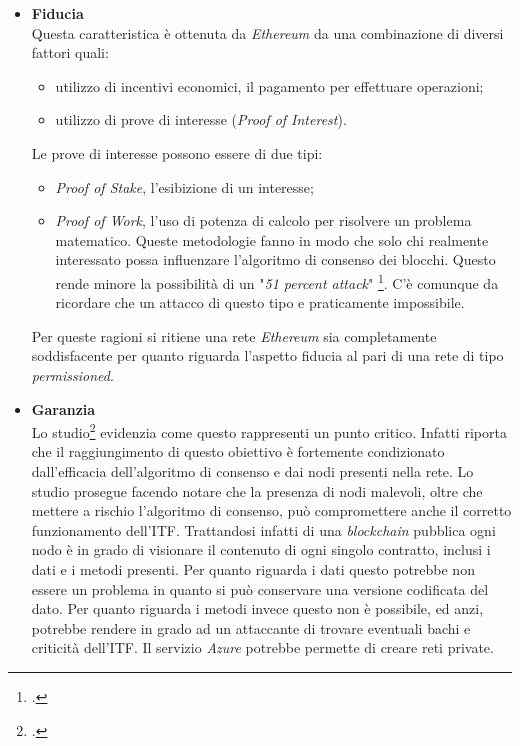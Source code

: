 \begin{itemize}
    \item \textbf{Fiducia} \\
    Questa caratteristica è ottenuta da \emph{Ethereum} da una combinazione di diversi fattori quali:
    \begin{itemize}
        \item utilizzo di incentivi economici, il pagamento per effettuare operazioni;
        \item utilizzo di prove di interesse (\emph{Proof of Interest}).
    \end{itemize}
    Le prove di interesse possono essere di due tipi:
    \begin{itemize}
        \item \emph{Proof of Stake}, l’esibizione di un interesse;
        \item \emph{Proof of Work}, l’uso di potenza di calcolo per risolvere un problema matematico.
        Queste metodologie fanno in modo che solo chi realmente interessato possa influenzare l’algoritmo di consenso dei blocchi. Questo rende minore la possibilità di un "\emph{51 percent attack}" \footcite{site:51-attack}. C’è comunque da ricordare che un attacco di questo tipo e praticamente impossibile.
    \end{itemize}
    Per queste ragioni si ritiene una rete \emph{Ethereum} sia completamente soddisfacente per quanto riguarda l’aspetto fiducia al pari di una rete di tipo \emph{permissioned}.
    \item \textbf{Garanzia}\\
    Lo studio\footcite{farah:The-Dawn-of-Decentralized-Identity} evidenzia come questo rappresenti un punto critico. Infatti riporta che il raggiungimento di questo obiettivo è fortemente condizionato dall’efficacia dell’algoritmo di consenso e dai nodi presenti nella rete. Lo studio prosegue facendo notare che la presenza di nodi malevoli, oltre che mettere a rischio l’algoritmo di consenso, può compromettere anche il corretto funzionamento dell’ITF. Trattandosi infatti di una \emph{blockchain} pubblica ogni nodo è in grado di visionare il contenuto di ogni singolo contratto, inclusi i dati e i metodi presenti. Per quanto riguarda i dati questo potrebbe non essere un problema in quanto si può conservare una versione codificata del dato. Per quanto riguarda i metodi invece questo non è possibile, ed anzi, potrebbe rendere in grado ad un attaccante di trovare eventuali bachi e criticità dell’ITF. Il servizio \emph{Azure} potrebbe permette di creare reti private.

\end{itemize}
